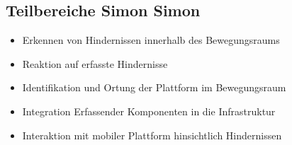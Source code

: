 \subsection{Teilbereiche Simon Simon}
\begin{itemize}
\item Erkennen von Hindernissen innerhalb des Bewegungsraums
\item Reaktion auf erfasste Hindernisse
\item Identifikation und Ortung der Plattform im Bewegungsraum
\item Integration Erfassender Komponenten in die Infrastruktur
\item Interaktion mit mobiler Plattform hinsichtlich Hindernissen
\end{itemize}